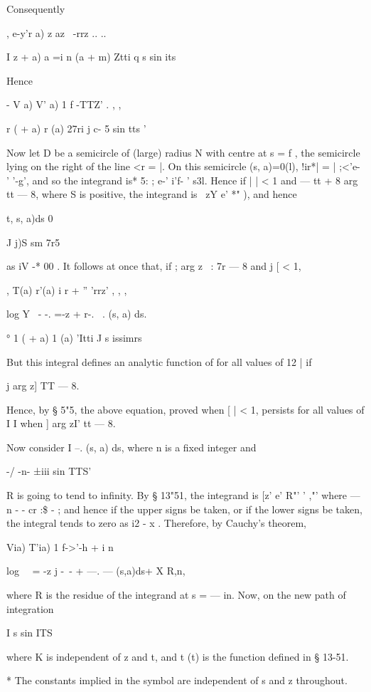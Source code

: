 {{Consequently 

, e-y'r a) z   az \   -rrz  .. .. 

I  z + a) a  =i n (a + m) Ztti   q s sin its 

Hence 

- V a) V' a) 1 f -TTZ'  . , , 

  r (  + a) r (a) 27ri j c- 5 sin tts   ' 

Now let D be a semicircle of (large) radius N with centre at s = f , the 
semicircle lying on the right of the line <r = |. On this semicircle 
 (s, a)=0(l), !ir*| = | ;<'e- ' '-g', and so the integrand is*   5: ; e-' i'f- ' s3l. 
Hence if |   | < 1 and — tt + 8   arg   tt — 8, where S is positive, the integrand 
is  \ zY e' *" ), and hence 

t, s, a)ds  0 



J j)S sm 7r5 

as iV  -* 00 . It follows at once that, if ; arg z \ : 7r — 8 and j   [ < 1, 

, T(a) r'(a) i r  +  '' 'rrz'  , , , 

log Y ~- -. =-z   +  r-. ~.  (s, a) ds. 

° 1 (  + a) 1 (a) 'Itti J s  issimrs 

But this integral defines an analytic function of   for all values of 12  | if 

j arg z]  TT — 8. 

Hence, by § 5"5, the above equation, proved when [   | < 1, persists for all 
values of I   I when ] arg zI' tt — 8. 

Now consider I --.  (s, a) ds, where n is a fixed integer and 

-/ -n- ±iii   sin TTS'  

R is going to tend to infinity. By § 13"51, the integrand is [z'  e'  R"' '  ,"' 
where — n - -   cr :\$ - ; and hence if the upper signs be taken, or if the lower 
signs be taken, the integral tends to zero as i2 -  x . 
Therefore, by Cauchy's theorem, 

Via) T'ia) 1 f->'-h +  i   n 

log   \ \  = -z j -~- +  —. —   (s,a)ds+ X R,n, 

where R  is the residue of the integrand at s = — in. 
Now, on the new path of integration 

I s sin ITS \ 

where K is independent of z and t, and t (t) is the function defined in 
§ 13-51. 

* The constants implied in the symbol are independent of s and z throughout. 



}}
